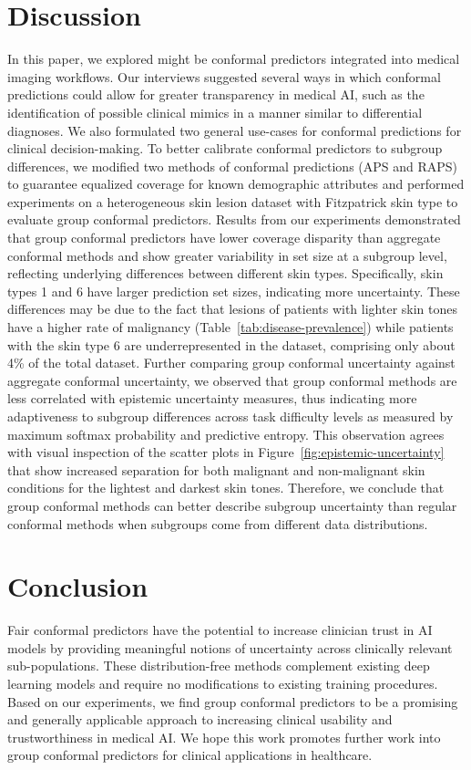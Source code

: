 \documentclass[letterpaper]{article} %
\begin{document}
\section{Discussion}
In this paper, we explored might be conformal predictors integrated into medical imaging workflows.
Our interviews suggested several ways in which conformal predictions could allow for greater transparency in medical AI, such as the identification of possible clinical mimics in a manner similar to differential diagnoses.
We also formulated two general use-cases for conformal predictions for clinical decision-making.  To better calibrate conformal predictors to subgroup differences, we modified two methods of conformal predictions (APS and RAPS) to guarantee equalized coverage for known demographic attributes and performed experiments on a heterogeneous skin lesion dataset with Fitzpatrick skin type to evaluate group conformal predictors.
Results from our experiments demonstrated that group conformal predictors have lower coverage disparity than aggregate conformal methods and show greater variability in set size at a subgroup level, reflecting underlying differences between different skin types.
Specifically, skin types 1 and 6 have larger prediction set sizes, indicating more uncertainty.
These differences may be due to the fact that lesions of patients with lighter skin tones have a higher rate of malignancy (Table~\ref{tab:disease-prevalence}) while patients with the skin type 6 are underrepresented in the dataset, comprising only about 4\% of the total dataset.  Further comparing group conformal uncertainty against aggregate conformal uncertainty, we observed that group conformal methods are less correlated with epistemic uncertainty measures, thus indicating more adaptiveness to subgroup differences across task difficulty levels as measured by maximum softmax probability and predictive entropy.
This observation agrees with visual inspection of the scatter plots in Figure~\ref{fig:epistemic-uncertainty} that show increased separation for both malignant and non-malignant skin conditions for the lightest and darkest skin tones.
Therefore, we conclude that group conformal methods can better describe subgroup uncertainty than regular conformal methods when subgroups come from different data distributions.

\section{Conclusion}
Fair conformal predictors have the potential to increase clinician trust in AI models by providing meaningful notions of uncertainty across clinically relevant sub-populations.
These distribution-free methods complement existing deep learning models and require no modifications to existing training procedures.
Based on our experiments, we find group conformal predictors to be a promising and generally applicable approach to increasing clinical usability and trustworthiness in medical AI.
We hope this work promotes further work into group conformal predictors for clinical applications in healthcare.
\end{document}
